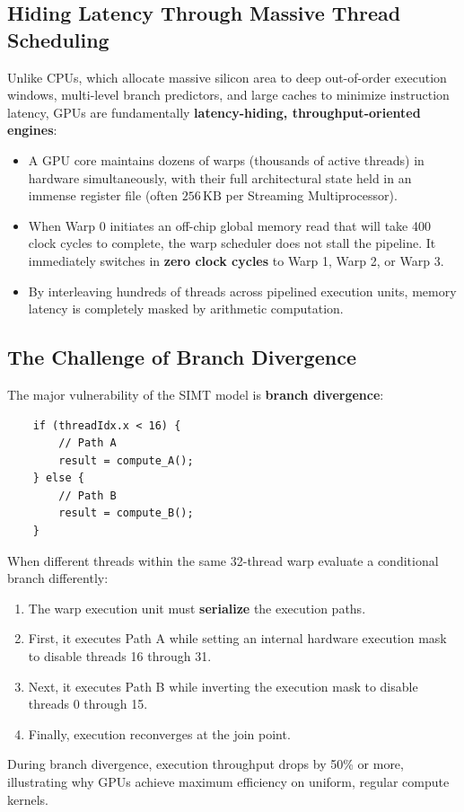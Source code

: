 \subsection{Hiding Latency Through Massive Thread Scheduling}
Unlike CPUs, which allocate massive silicon area to deep out-of-order execution windows, multi-level branch predictors, and large caches to minimize instruction latency, GPUs are fundamentally \textbf{latency-hiding, throughput-oriented engines}:
\begin{itemize}
    \item A GPU core maintains dozens of warps (thousands of active threads) in hardware simultaneously, with their full architectural state held in an immense register file (often $256\,\text{KB}$ per Streaming Multiprocessor).
    \item When Warp 0 initiates an off-chip global memory read that will take 400 clock cycles to complete, the warp scheduler does not stall the pipeline. It immediately switches in \textbf{zero clock cycles} to Warp 1, Warp 2, or Warp 3.
    \item By interleaving hundreds of threads across pipelined execution units, memory latency is completely masked by arithmetic computation.
\end{itemize}

\subsection{The Challenge of Branch Divergence}
The major vulnerability of the SIMT model is \textbf{branch divergence}:
\begin{verbatim}
    if (threadIdx.x < 16) {
        // Path A
        result = compute_A();
    } else {
        // Path B
        result = compute_B();
    }
\end{verbatim}
When different threads within the same 32-thread warp evaluate a conditional branch differently:
\begin{enumerate}
    \item The warp execution unit must \textbf{serialize} the execution paths.
    \item First, it executes Path A while setting an internal hardware execution mask to disable threads 16 through 31.
    \item Next, it executes Path B while inverting the execution mask to disable threads 0 through 15.
    \item Finally, execution reconverges at the join point.
\end{enumerate}
During branch divergence, execution throughput drops by 50\% or more, illustrating why GPUs achieve maximum efficiency on uniform, regular compute kernels.

